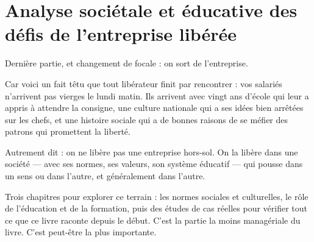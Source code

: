 \part{Analyse sociétale et éducative des défis de l'entreprise libérée}

Dernière partie, et changement de focale : on sort de l'entreprise.

Car voici un fait têtu que tout libérateur finit par rencontrer : vos salariés n'arrivent pas vierges le lundi matin. Ils arrivent avec vingt ans d'école qui leur a appris à attendre la consigne, une culture nationale qui a ses idées bien arrêtées sur les chefs, et une histoire sociale qui a de bonnes raisons de se méfier des patrons qui promettent la liberté.

Autrement dit : on ne libère pas une entreprise hors-sol. On la libère dans une société — avec ses normes, ses valeurs, son système éducatif — qui pousse dans un sens ou dans l'autre, et généralement dans l'autre.

Trois chapitres pour explorer ce terrain : les normes sociales et culturelles, le rôle de l'éducation et de la formation, puis des études de cas réelles pour vérifier tout ce que ce livre raconte depuis le début. C'est la partie la moins managériale du livre. C'est peut-être la plus importante.
